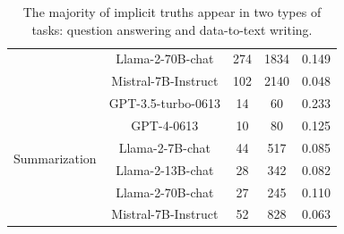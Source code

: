 \begin{table}[h]
\begin{tabular}{ccccc}
                                                                                & Llama-2-70B-chat    & 274                   & 1834                  & 0.149 \\
                                                                                & Mistral-7B-Instruct & 102                   & 2140                  & 0.048 \\
\midrule
\multirow{6}{*}{Summarization}                                                  & GPT-3.5-turbo-0613  & 14                    & 60                    & 0.233 \\
                                                                                & GPT-4-0613          & 10                    & 80                    & 0.125 \\
                                                                                & Llama-2-7B-chat     & 44                    & 517                   & 0.085 \\
                                                                                & Llama-2-13B-chat    & 28                    & 342                   & 0.082 \\
                                                                                & Llama-2-70B-chat    & 27                    & 245                   & 0.110 \\
                                                                                & Mistral-7B-Instruct & 52                    & 828                   & 0.063 \\
\bottomrule
\end{tabular}
\caption{The majority of implicit truths appear in two types of tasks: question answering and data-to-text writing.}
\label{tab:implicit_true}
\end{table}
